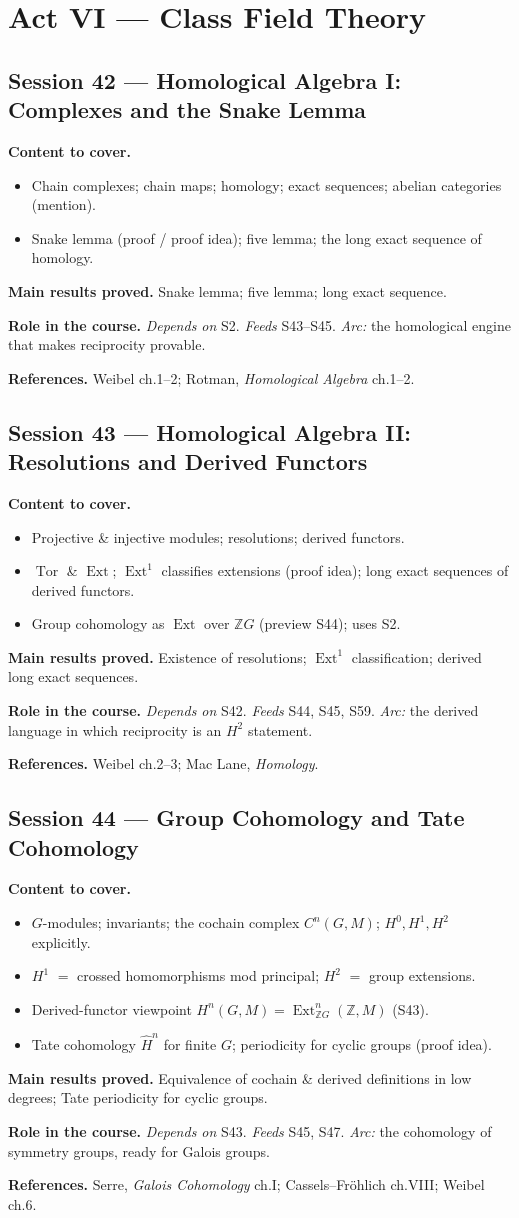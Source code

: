 \documentclass[11pt,a4paper]{article}
\newcommand{\sess}[2]{\subsection[#1. #2]{Session #1 --- #2}}
\newcommand{\chead}{\par\smallskip\noindent\textbf{Content to cover.}}
\newcommand{\proved}[1]{\par\smallskip\noindent\textbf{Main results proved.} #1}
\newcommand{\role}[1]{\par\smallskip\noindent\textbf{Role in the course.} #1}
\newcommand{\srefs}[1]{\par\smallskip\noindent\textbf{References.} #1}
\newcommand{\Z}{\mathbb{Z}}
\newcommand{\Ext}{\operatorname{Ext}}
\newcommand{\Tor}{\operatorname{Tor}}
\begin{document}
	\section{Act VI --- Class Field Theory}
	
	\sess{42}{Homological Algebra I: Complexes and the Snake Lemma}
	\chead
	\begin{itemize}
		\item Chain complexes; chain maps; homology; exact sequences; abelian categories (mention).
		\item Snake lemma (proof / proof idea); five lemma; the long exact sequence of homology.
	\end{itemize}
	\proved{Snake lemma; five lemma; long exact sequence.}
	\role{\emph{Depends on} S2. \emph{Feeds} S43--S45. \emph{Arc:} the homological engine that makes reciprocity provable.}
	\srefs{Weibel ch.1--2; Rotman, \emph{Homological Algebra} ch.1--2.}
	
	\sess{43}{Homological Algebra II: Resolutions and Derived Functors}
	\chead
	\begin{itemize}
		\item Projective \& injective modules; resolutions; derived functors.
		\item $\Tor$ \& $\Ext$; $\Ext^1$ classifies extensions (proof idea); long exact sequences of derived functors.
		\item Group cohomology as $\Ext$ over $\Z G$ (preview S44); uses S2.
	\end{itemize}
	\proved{Existence of resolutions; $\Ext^1$ classification; derived long exact sequences.}
	\role{\emph{Depends on} S42. \emph{Feeds} S44, S45, S59. \emph{Arc:} the derived language in which reciprocity is an $H^2$ statement.}
	\srefs{Weibel ch.2--3; Mac Lane, \emph{Homology}.}
	
	\sess{44}{Group Cohomology and Tate Cohomology}
	\chead
	\begin{itemize}
		\item $G$-modules; invariants; the cochain complex $C^n(G,M)$; $H^0,H^1,H^2$ explicitly.
		\item $H^1$ $=$ crossed homomorphisms mod principal; $H^2$ $=$ group extensions.
		\item Derived-functor viewpoint $H^n(G,M)=\Ext^n_{\Z G}(\Z,M)$ (S43).
		\item Tate cohomology $\hat H^n$ for finite $G$; periodicity for cyclic groups (proof idea).
	\end{itemize}
	\proved{Equivalence of cochain \& derived definitions in low degrees; Tate periodicity for cyclic groups.}
	\role{\emph{Depends on} S43. \emph{Feeds} S45, S47. \emph{Arc:} the cohomology of symmetry groups, ready for Galois groups.}
	\srefs{Serre, \emph{Galois Cohomology} ch.I; Cassels--Fr\"ohlich ch.VIII; Weibel ch.6.}
	
\end{document}
